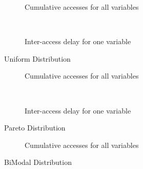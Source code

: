 \begin{figure}
        \centering
        \begin{subfigure}[b]{0.4\textwidth}
                \centering
                \caption{Cumulative accesses for all variables} \label{Uniform-cumul}
        \end{subfigure}
         ~~~ %
        \begin{subfigure}[b]{0.4\textwidth}
                \centering
                \caption{Inter-access delay for one variable} \label{Uniform-IAD}
        \end{subfigure}
        \caption{Uniform Distribution}
\end{figure}


\begin{figure}
        \centering
        \begin{subfigure}[b]{0.4\textwidth}
                \centering
                \caption{Cumulative accesses for all variables} \label{Pareto-cumul}
        \end{subfigure}
        ~~~ %
        \begin{subfigure}[b]{0.4\textwidth}
                \centering
                \caption{Inter-access delay for one variable} \label{Pareto-IAD}
        \end{subfigure}
        \caption{Pareto Distribution}
\end{figure}


\begin{figure}
        \centering
        \begin{subfigure}[b]{0.4\textwidth}
                \centering
                \caption{Cumulative accesses for all variables} \label{BiModal-cumul}
        \end{subfigure}
        \caption{BiModal Distribution}
\end{figure}


